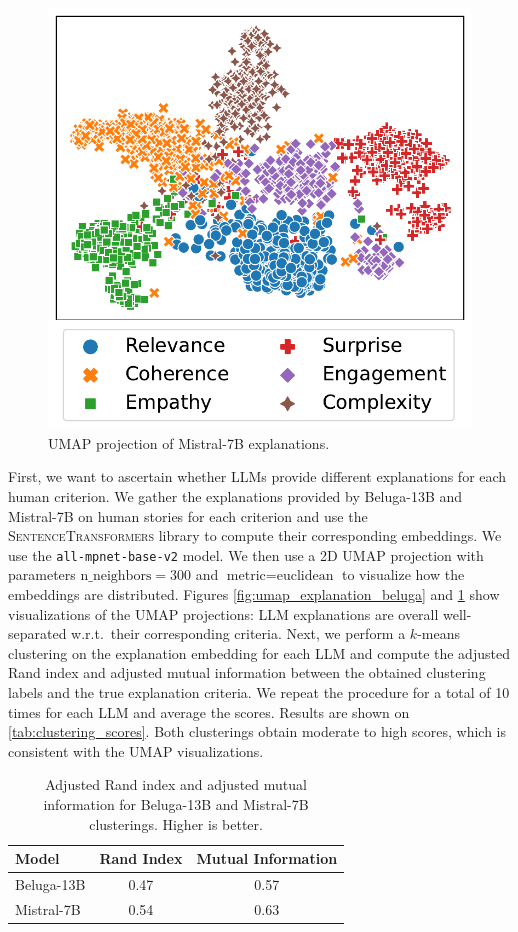 \begin{figure}[h!]
\centering
\includegraphics[width=0.6\columnwidth]{pictures/embedding_umap_mistral.pdf}
\caption{UMAP projection of Mistral-7B explanations.}
\label{fig:umap_explanation_mistral}
\end{figure}

First, we want to ascertain whether LLMs provide different explanations for each human criterion. We gather the explanations provided by Beluga-13B and Mistral-7B on human stories for each criterion and use the \textsc{SentenceTransformers} library \citep{reimers-2019-sentence-bert} to compute their corresponding embeddings. We use the \texttt{all-mpnet-base-v2} model. We then use a 2D UMAP projection \citep{mcinnes2018umap} with parameters $\textrm{n\_neighbors}=300$ and $\textrm{metric}=\textrm{euclidean}$ to visualize how the embeddings are distributed. Figures \ref{fig:umap_explanation_beluga} and \ref{fig:umap_explanation_mistral} show visualizations of the UMAP projections: LLM explanations are overall well-separated w.r.t.\ their corresponding criteria. Next, we perform a $k$-means clustering on the explanation embedding for each LLM and compute the adjusted Rand index and adjusted mutual information between the obtained clustering labels and the true explanation criteria. We repeat the procedure for a total of 10 times for each LLM and average the scores. Results are shown on \autoref{tab:clustering_scores}. Both clusterings obtain moderate to high scores, which is consistent with the UMAP visualizations.

\begin{table}[!h]
\centering
\begin{tabular}{lcc}
\toprule
\textbf{Model} & \textbf{Rand Index} & \textbf{Mutual Information} \\
\midrule
Beluga-13B & 0.47 & 0.57 \\
Mistral-7B & 0.54 & 0.63 \\
\bottomrule
\end{tabular}
\caption{Adjusted Rand index and adjusted mutual information for Beluga-13B and Mistral-7B clusterings. Higher is better.}
\label{tab:clustering_scores}
\end{table}

